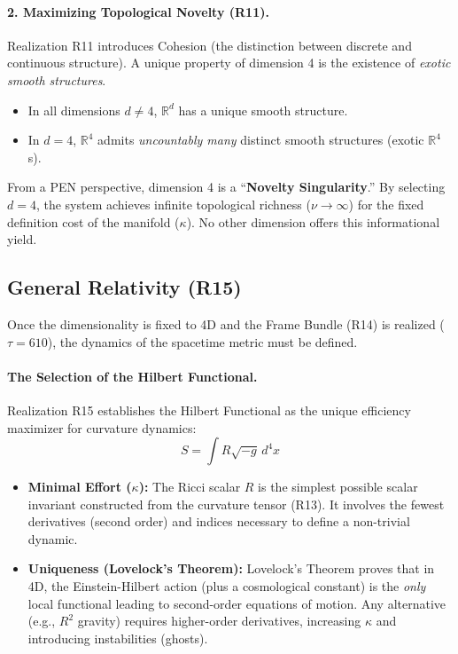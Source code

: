 \documentclass[12pt,a4paper]{article}
\theoremstyle{definition}
\newcommand{\R}{\mathbb{R}}
\newcommand{\kap}{\kappa}
\begin{document}
\paragraph{2. Maximizing Topological Novelty (R11).}
Realization R11 introduces Cohesion (the distinction between discrete and continuous structure). A unique property of dimension 4 is the existence of \emph{exotic smooth structures}.

\begin{itemize}[leftmargin=2em]
    \item In all dimensions $d \neq 4$, $\R^d$ has a unique smooth structure.
    \item In $d=4$, $\R^4$ admits \emph{uncountably many} distinct smooth structures (exotic $\R^4$s).
\end{itemize}

From a PEN perspective, dimension 4 is a ``\textbf{Novelty Singularity}.'' By selecting $d=4$, the system achieves infinite topological richness ($\nu \to \infty$) for the fixed definition cost of the manifold ($\kap$). No other dimension offers this informational yield.

\subsection{General Relativity (R15)}

Once the dimensionality is fixed to 4D and the Frame Bundle (R14) is realized ($\tau=610$), the dynamics of the spacetime metric must be defined.

\paragraph{The Selection of the Hilbert Functional.}
Realization R15 establishes the Hilbert Functional as the unique efficiency maximizer for curvature dynamics:
\begin{equation}
    S = \int R \sqrt{-g} \, d^4x
\end{equation}

\begin{itemize}[leftmargin=2em]
    \item \textbf{Minimal Effort ($\kap$):} The Ricci scalar $R$ is the simplest possible scalar invariant constructed from the curvature tensor (R13). It involves the fewest derivatives (second order) and indices necessary to define a non-trivial dynamic.
    \item \textbf{Uniqueness (Lovelock's Theorem):} Lovelock's Theorem proves that in 4D, the Einstein-Hilbert action (plus a cosmological constant) is the \emph{only} local functional leading to second-order equations of motion. Any alternative (e.g., $R^2$ gravity) requires higher-order derivatives, increasing $\kap$ and introducing instabilities (ghosts).
\end{itemize}
\end{document}

